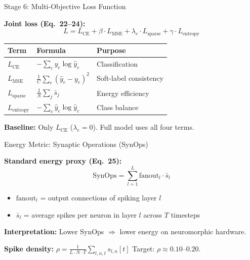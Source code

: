 \documentclass[10pt]{beamer}
\begin{document}
\begin{frame}{Stage 6: Multi-Objective Loss Function}

\footnotesize
\textbf{Joint loss (Eq.~22--24):}
\vspace{-2pt}
\begin{equation}
\boxed{L = L_{\text{CE}} + \beta \cdot L_{\text{MSE}} + \lambda_e \cdot L_{\text{sparse}} + \gamma \cdot L_{\text{entropy}}}
\tag{Eq.~22}
\end{equation}

\vspace{-2pt}
\begin{tabular}{lll}
\toprule
\textbf{Term} & \textbf{Formula} & \textbf{Purpose} \\
\midrule
$L_{\text{CE}}$ & $-\sum_c y_c \log \hat{y}_c$ & Classification \\
$L_{\text{MSE}}$ & $\frac{1}{C}\sum_c (\hat{y}_c - y_c)^2$ & Soft-label consistency \\
$L_{\text{sparse}}$ & $\frac{1}{N}\sum_j \bar{s}_j$ & Energy efficiency \\
$L_{\text{entropy}}$ & $-\sum_c \hat{y}_c \log \hat{y}_c$ & Class balance \\
\bottomrule
\end{tabular}

\vspace{2pt}
\textbf{Baseline:} Only $L_{\text{CE}}$ ($\lambda_e = 0$). Full model uses all four terms.

\end{frame}

\begin{frame}{Energy Metric: Synaptic Operations (SynOps)}

\footnotesize
\textbf{Standard energy proxy (Eq.~25):}
\vspace{-2pt}
\begin{equation}
\boxed{\text{SynOps} = \sum_{l=1}^{L} \text{fanout}_l \cdot \bar{s}_l}
\tag{Eq.~25}
\end{equation}

\vspace{-4pt}
\begin{itemize}
  \item $\text{fanout}_l$ = output connections of spiking layer $l$
  \item $\bar{s}_l$ = average spikes per neuron in layer $l$ across $T$ timesteps
\end{itemize}

\vspace{2pt}
\textbf{Interpretation:} Lower SynOps $\Rightarrow$ lower energy on neuromorphic hardware.

\vspace{2pt}
\textbf{Spike density:} $\rho = \frac{1}{L \cdot N \cdot T} \sum_{l,n,t} s_{l,n}[t]$ \quad Target: $\rho \approx 0.10$--$0.20$.

\end{frame}
\end{document}
